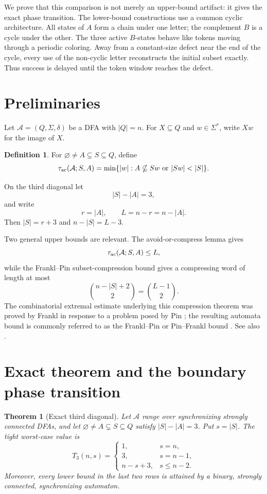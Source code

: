 \documentclass[11pt]{article}
\newtheorem{theorem}{Theorem}
\theoremstyle{definition}
\newtheorem{definition}{Definition}
\theoremstyle{remark}
\newcommand{\Acal}{\mathcal A}
\newcommand{\tauac}{\tau_{\rm ac}}
\begin{document}
We prove that this comparison is not merely an upper-bound artifact: it gives the exact phase transition. The lower-bound constructions use a common cyclic architecture. All states of $A$ form a chain under one letter; the complement $B$ is a cycle under the other. The three active $B$-states behave like tokens moving through a periodic coloring. Away from a constant-size defect near the end of the cycle, every use of the non-cyclic letter reconstructs the initial subset exactly. Thus success is delayed until the token window reaches the defect.

\section{Preliminaries}
Let $\Acal=(Q,\Sigma,\delta)$ be a DFA with $|Q|=n$. For $X\subseteq Q$ and $w\in\Sigma^*$, write $Xw$ for the image of $X$.

\begin{definition}
For $\varnothing\ne A\subsetneq S\subseteq Q$, define
\[
\tauac(\Acal;S,A)=\min\{|w|:A\nsubseteq Sw\text{ or }|Sw|<|S|\}.
\]
\end{definition}

On the third diagonal let
\[
|S|-|A|=3,
\]
and write
\[
r=|A|,\qquad L=n-r=n-|A|.
\]
Then $|S|=r+3$ and $n-|S|=L-3$.

Two general upper bounds are relevant. The avoid-or-compress lemma gives
\begin{equation}\label{eq:aoc}
\tauac(\Acal;S,A)\le L,
\end{equation}
while the Frankl--Pin subset-compression bound gives a compressing word of length at most
\begin{equation}\label{eq:fp}
\binom{n-|S|+2}{2}=\binom{L-1}{2}.
\end{equation}
The combinatorial extremal estimate underlying this compression theorem was proved by Frankl in response to a problem posed by Pin \cite{Frankl1982}; the resulting automata bound is commonly referred to as the Frankl--Pin or Pin--Frankl bound \cite{Volkov2022}. See also \cite{Szykula2018,Szykula2026}.

\section{Exact theorem and the boundary phase transition}
\begin{theorem}[Exact third diagonal]\label{thm:main}
Let $\Acal$ range over synchronizing strongly connected DFAs, and let $\varnothing\ne A\subsetneq S\subseteq Q$ satisfy $|S|-|A|=3$. Put $s=|S|$. The tight worst-case value is
\[
T_3(n,s)=
\begin{cases}
1,&s=n,\\[1mm]
3,&s=n-1,\\[1mm]
n-s+3,&s\le n-2.
\end{cases}
\]
Moreover, every lower bound in the last two rows is attained by a binary, strongly connected, synchronizing automaton.
\end{theorem}
\end{document}
